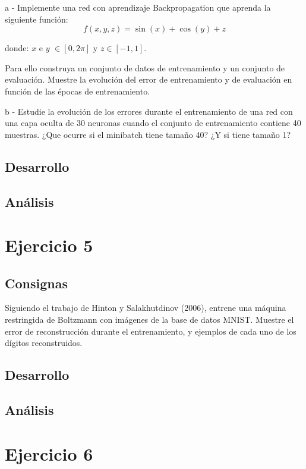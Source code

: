 \documentclass[11pt]{article} %
\begin{document}
a - Implemente una red con aprendizaje Backpropagation que aprenda la siguiente función:
$$
f (x , y , z)= \sin(x)+\cos(y)+z
$$

donde: $x$ e $y$ $\in [0,2 \pi]$ y $z \in [-1,1]$.

Para ello construya un conjunto de datos de entrenamiento y un conjunto de evaluación. Muestre la evolución del error de entrenamiento y de evaluación en función de las épocas de entrenamiento.

b - Estudie la evolución de los errores durante el entrenamiento de una red con una capa oculta de 30 neuronas cuando el conjunto de entrenamiento contiene 40 muestras. ¿Que ocurre si el minibatch tiene tamaño 40? ¿Y si tiene tamaño 1?

\subsection{Desarrollo}

\subsection{Análisis}






\section{Ejercicio 5}

\subsection{Consignas}

Siguiendo el trabajo de Hinton y Salakhutdinov (2006), entrene una máquina restringida de Boltzmann con imágenes de la base de datos MNIST. Muestre el error de reconstrucción durante el entrenamiento, y ejemplos de cada uno de los dígitos reconstruidos.
\subsection{Desarrollo}

\subsection{Análisis}


\section{Ejercicio 6}
\end{document}

